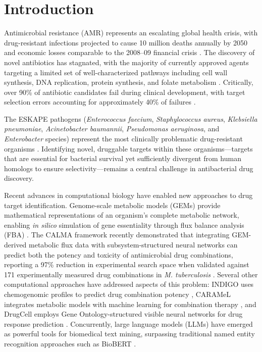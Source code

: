 \documentclass[12pt,a4paper]{article}
\begin{document}
\section{Introduction}

Antimicrobial resistance (AMR) represents an escalating global health crisis, with drug-resistant infections projected to cause 10 million deaths annually by 2050 and economic losses comparable to the 2008--09 financial crisis \citep{oneill2016}. The discovery of novel antibiotics has stagnated, with the majority of currently approved agents targeting a limited set of well-characterized pathways including cell wall synthesis, DNA replication, protein synthesis, and folate metabolism \citep{lewis2020}. Critically, over 90\% of antibiotic candidates fail during clinical development, with target selection errors accounting for approximately 40\% of failures \citep{payne2007}.

The ESKAPE pathogens (\textit{Enterococcus faecium}, \textit{Staphylococcus aureus}, \textit{Klebsiella pneumoniae}, \textit{Acinetobacter baumannii}, \textit{Pseudomonas aeruginosa}, and \textit{Enterobacter} species) represent the most clinically problematic drug-resistant organisms \citep{rice2008}. Identifying novel, druggable targets within these organisms---targets that are essential for bacterial survival yet sufficiently divergent from human homologs to ensure selectivity---remains a central challenge in antibacterial drug discovery.

Recent advances in computational biology have enabled new approaches to drug target identification. Genome-scale metabolic models (GEMs) provide mathematical representations of an organism's complete metabolic network, enabling \textit{in silico} simulation of gene essentiality through flux balance analysis (FBA) \citep{orth2010}. The CALMA framework recently demonstrated that integrating GEM-derived metabolic flux data with subsystem-structured neural networks can predict both the potency and toxicity of antimicrobial drug combinations, reporting a 97\% reduction in experimental search space when validated against 171 experimentally measured drug combinations in \textit{M. tuberculosis} \citep{arora2026}. Several other computational approaches have addressed aspects of this problem: INDIGO uses chemogenomic profiles to predict drug combination potency \citep{chandrasekaran2016}, CARAMeL integrates metabolic models with machine learning for combination therapy \citep{ji2023}, and DrugCell employs Gene Ontology-structured visible neural networks for drug response prediction \citep{kuenzi2020}. Concurrently, large language models (LLMs) have emerged as powerful tools for biomedical text mining, surpassing traditional named entity recognition approaches such as BioBERT \citep{lee2020, gu2022}.
\end{document}
